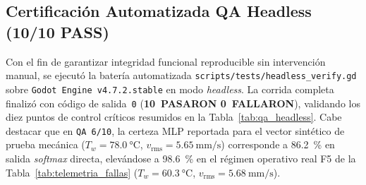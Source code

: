 \subsection{Certificación Automatizada QA Headless (10/10 PASS)}

Con el fin de garantizar integridad funcional reproducible sin intervención manual, se ejecutó la batería automatizada \texttt{scripts/tests/headless\_verify.gd} sobre \texttt{Godot Engine v4.7.2.stable} en modo \emph{headless}. La corrida completa finalizó con código de salida~\texttt{0} (\textbf{10~PASARON \textbar{} 0~FALLARON}), validando los diez puntos de control críticos resumidos en la Tabla~\ref{tab:qa_headless}. Cabe destacar que en \texttt{QA~6/10}, la certeza MLP reportada para el vector sintético de prueba mecánica ($T_w=\qty{78.0}{\celsius}$, $v_{\text{rms}}=\qty{5.65}{\milli\meter\per\second}$) corresponde a \qty{86.2}{\percent} en salida \emph{softmax} directa, elevándose a \qty{98.6}{\percent} en el régimen operativo real F5 de la Tabla~\ref{tab:telemetria_fallas} ($T_w=\qty{60.3}{\celsius}$, $v_{\text{rms}}=\qty{5.68}{\milli\meter\per\second}$).

